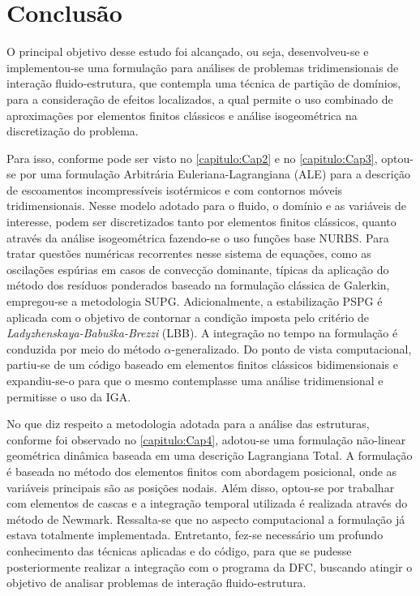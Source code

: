 \chapter{Conclusão} 

O principal objetivo desse estudo foi alcançado, ou seja, desenvolveu-se e implementou-se uma formulação
para análises de problemas tridimensionais de interação fluido-estrutura, que contempla uma técnica de 
partição de domínios, para a consideração de efeitos localizados, a qual permite o uso combinado de aproximações por elementos finitos clássicos
e análise isogeométrica na discretização do problema.

Para isso, conforme pode ser visto no \autoref{capitulo:Cap2} e no \autoref{capitulo:Cap3}, optou-se por uma formulação Arbitrária Euleriana-Lagrangiana (ALE) para a descrição de escoamentos incompressíveis isotérmicos e com contornos móveis tridimensionais. Nesse modelo adotado para o fluido, o domínio e as variáveis de interesse, podem ser discretizados tanto por elementos finitos clássicos, quanto através da análise isogeométrica fazendo-se o uso funções base NURBS. Para tratar questões numéricas recorrentes nesse sistema de equações, como as oscilações espúrias em casos de convecção dominante, típicas da aplicação do método dos resíduos ponderados baseado na formulação clássica de Galerkin, empregou-se a metodologia SUPG. Adicionalmente, a estabilização PSPG é aplicada com o objetivo de contornar a condição imposta pelo critério de \textit{Ladyzhenskaya-Babuška-Brezzi} (LBB). A integração no tempo na formulação é conduzida por meio do método $\alpha$-generalizado. Do ponto de vista computacional, partiu-se de um código baseado em elementos finitos clássicos bidimensionais e expandiu-se-o para que o mesmo contemplasse uma análise tridimensional e permitisse o uso da IGA.  

No que diz respeito a metodologia adotada para a análise das estruturas, conforme foi observado no \autoref{capitulo:Cap4}, adotou-se uma formulação não-linear geométrica dinâmica baseada em uma descrição Lagrangiana Total. A formulação é baseada no método dos elementos finitos com abordagem posicional, onde as variáveis principais são as posições nodais. Além disso, optou-se por trabalhar com elementos de cascas e a integração temporal utilizada é realizada através do método de Newmark. Ressalta-se que no aspecto computacional a formulação já estava totalmente implementada. Entretanto, fez-se necessário um profundo conhecimento das técnicas aplicadas e do código, para que se pudesse posteriormente realizar a integração com o programa da DFC, buscando atingir o objetivo de analisar problemas de interação fluido-estrutura.

